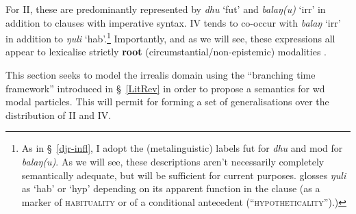 For \gls{II}, these are predominantly represented by \textit{dhu} `\gls{fut}' and \textit{balaŋ(u)} `\gls{irr}' in addition to clauses with imperative syntax. \gls{IV} tends to co-occur with \textit{balaŋ} `\gls{irr}' in addition to \textit{ŋuli} `\gls{hab}'.\footnote{As in \S~\ref{djr-infl}, I adopt the (metalinguistic) labels \gls{fut} for \textit{dhu} \citep[following][]{Wilkinson1991} and \gls{mod} for \textit{balaŋ(u)}. As we will see, these descriptions aren't necessarily completely semantically adequate, but will be sufficient for current purposes. \citet{Wilkinson1991} glosses \textit{ŋuli} as `\gls{hab}' or `\gls{hyp}' depending on its apparent function in the clause (as a marker of \textsc{habituality} or of a conditional antecedent (``\textsc{hypotheticality}'').)\label{irr-glossing}} Importantly, and as we will see, these expressions all appear to lexicalise strictly \textbf{root} (circumstantial\slash{}non-epistemic) modalities \citep[\textit{contra} claims in][123]{VanderWal1992}.

This section seeks to model the irrealis domain using the ``branching time framework'' introduced in \S~\ref{LitRev} in order to propose a semantics for \gls{wd} modal particles. This will permit for forming a set of generalisations over the distribution of \gls{II} and \gls{IV}.



